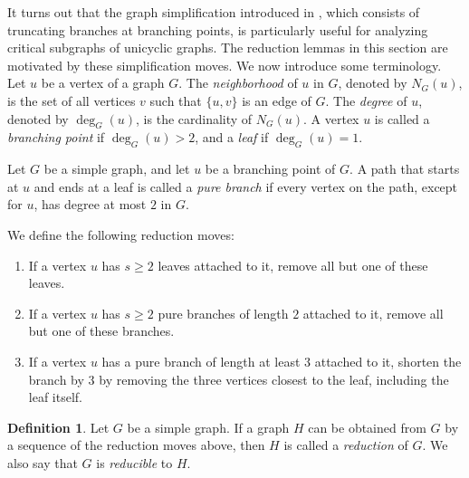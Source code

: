 \documentclass[12pt,amscd]{amsart}
\theoremstyle{definition}
\newtheorem{defn}[thm]{Definition}
\begin{document}
It turns out that the graph simplification introduced in \cite{PV}, which consists of truncating branches at branching points, is particularly useful for analyzing critical subgraphs of unicyclic graphs. The reduction lemmas in this section are motivated by these simplification moves. We now introduce some terminology. Let $u$ be a vertex of a graph $G$. The \emph{neighborhood} of $u$ in $G$, denoted by $N_G(u)$, is the set of all vertices $v$ such that $\{u,v\}$ is an edge of $G$. The \emph{degree} of $u$, denoted by $\deg_G(u)$, is the cardinality of $N_G(u)$. A vertex $u$ is called a \emph{branching point} if $\deg_G(u) > 2$, and a \emph{leaf} if $\deg_G(u) = 1$.

Let $G$ be a simple graph, and let $u$ be a branching point of $G$. A path that starts at $u$ and ends at a leaf is called a \emph{pure branch} if every vertex on the path, except for $u$, has degree at most $2$ in $G$.

We define the following reduction moves:

\begin{enumerate}
    \item If a vertex $u$ has $s \ge 2$ leaves attached to it, remove all but one of these leaves.
    \item If a vertex $u$ has $s \ge 2$ pure branches of length $2$ attached to it, remove all but one of these branches.
    \item If a vertex $u$ has a pure branch of length at least $3$ attached to it, shorten the branch by $3$ by removing the three vertices closest to the leaf, including the leaf itself.
\end{enumerate}

\begin{defn}
Let $G$ be a simple graph. If a graph $H$ can be obtained from $G$ by a sequence of the reduction moves above, then $H$ is called a \emph{reduction} of $G$. We also say that $G$ is \emph{reducible} to $H$.
\end{defn}
\end{document}
